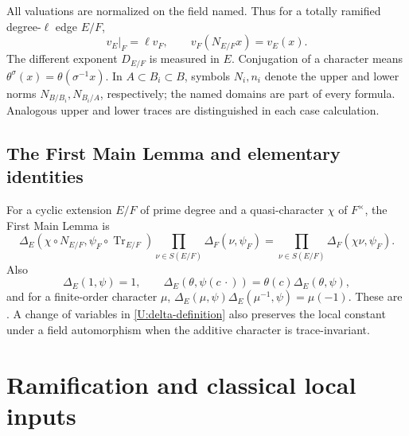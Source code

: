\documentclass[11pt]{amsart}
\theoremstyle{definition}
\theoremstyle{remark}
\newcommand{\Tr}{\operatorname{Tr}}
\begin{document}
All valuations are normalized on the field named. Thus for a totally
ramified degree-$\ell$ edge $E/F$,
\[
 v_E|_F=\ell v_F,\qquad v_F(N_{E/F}x)=v_E(x).
\]
The different exponent $D_{E/F}$ is measured in $E$.
Conjugation of a character means
$\theta^\sigma(x)=\theta(\sigma^{-1}x)$.
In $A\subset B_i\subset B$, symbols $N_i,n_i$ denote the upper and lower
norms $N_{B/B_i},N_{B_i/A}$, respectively; the named domains are part of
every formula. Analogous upper and lower traces are distinguished in each
case calculation.

\subsection{The First Main Lemma and elementary identities}\label{U:interface}
For a cyclic extension $E/F$ of prime degree and a quasi-character $\chi$
of $F^\times$, the First Main Lemma is
\begin{equation}\label{U:FML}
 \Delta_E(\chi\circ N_{E/F},\psi_F\circ\Tr_{E/F})
       \prod_{\nu\in S(E/F)}\Delta_F(\nu,\psi_F)
   =\prod_{\nu\in S(E/F)}\Delta_F(\chi\nu,\psi_F).
\end{equation}
Also
\[
 \Delta_E(1,\psi)=1,\qquad
 \Delta_E(\theta,\psi(c\,\cdot))=\theta(c)\Delta_E(\theta,\psi),
\]
and for a finite-order character $\mu$,
$\Delta_E(\mu,\psi)\Delta_E(\mu^{-1},\psi)=\mu(-1)$.
These are \cite[Theorem~1.1 and Lemmas~2.8, 2.10--2.11]{Ueda}.
A change of variables in \eqref{U:delta-definition} also preserves the
local constant under a field automorphism when the additive character is
trace-invariant.


\section{Ramification and classical local inputs}\label{sec:ramification}
\end{document}
